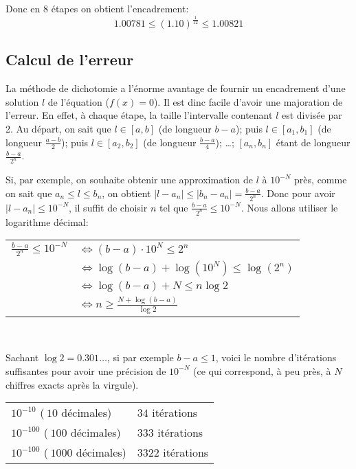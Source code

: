 \documentclass[a4paper,12pt]{article}
\begin{document}
    Donc en 8 étapes on obtient l'encadrement:
    $$ 1.00781 \leq (1.10)^{\frac{1}{12}} \leq 1.00821 $$

\subsection{Calcul de l'erreur}
    La méthode de dichotomie a l'énorme avantage de fournir un encadrement d'une solution $l$ de l'équation ($f(x) = 0$). Il est dinc facile d'avoir une majoration de l'erreur. En effet, à chaque étape, la taille l'intervalle contenant $l$ est divisée par 2. Au départ, on sait que $l \in [a, b]$ (de longueur $b-a$); puis $l \in [a_1, b_1]$ (de longueur $\frac{a-b}{2}$); puis $l \in [a_2, b_2]$ (de longueur $\frac{b-a}{4}$); \dots; $[a_n, b_n]$ étant de longueur $\frac{b-a}{2^n}$.

    \vspace{0.5cm}
    
    Si, par exemple, on souhaite obtenir une approximation de $l$ à $10^{-N}$ près, comme on sait que $a_n \leq l \leq b_n$, on obtient $|l - a_n| \leq |b_n - a_n| = \frac{b - a}{2^n}$. Donc pour avoir $|l - a_n| \leq 10^{-N}$, il suffit de choisir $n$ tel que $\frac{b-a}{2^n} \leq 10^{-N}$. Nous allons utiliser le logarithme décimal: 

    \vspace{0.5cm}
    
        \begin{tabular}{l l}
            $\frac{b-a}{2^n} \leq 10^{-N}$ & $\Leftrightarrow (b-a) \cdot 10^N \leq 2^n$ \\
                            & $ \Leftrightarrow \log(b-a) + \log(10^N) \leq \log(2^n)$ \\
                            & $ \Leftrightarrow \log(b-a) + N \leq n \log 2 $ \\
                            & $ \Leftrightarrow n \geq \frac{N + \log(b-a)}{\log 2} $\\
        \end{tabular} \\

    \vspace{0.5cm}
        
    Sachant $ \log 2 = 0.301 \dots$, si par exemple $b-a \leq 1$, voici le nombre d'itérations suffisantes pour avoir une précision de  $10^{-N}$ (ce qui correspond, à peu près, à $N$ chiffres exacts après la virgule).
    \begin{center}
        \begin{tabular}{l l}
            $10^{-10}$ ($~ 10$ décimales)   &  $34$ itérations \\
            $10^{-100}$ ($~100$ décimales)   &  $333$ itérations \\
            $10^{-100}$ ($~1000$ décimales)   &  $3322$ itérations \\
        \end{tabular}
    \end{center}
    
\end{document}
